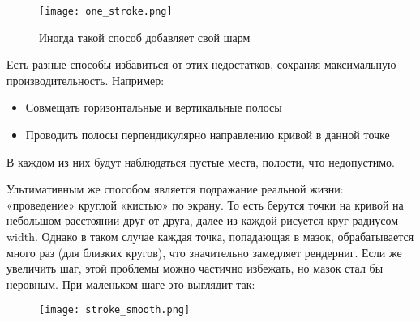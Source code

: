 \begin{figure}[h!]
    \centering
    \texttt{[image: one\_stroke.png]}
    \caption{Иногда такой способ добавляет свой шарм}
    \label{fig:pretty_vert_stroke}
\end{figure}
\FloatBarrier


Есть разные способы избавиться от этих недостатков, сохраняя максимальную производительность.
Например:
\begin{itemize}
    \item Совмещать горизонтальные и вертикальные полосы
    \item Проводить полосы перпендикулярно направлению кривой в данной точке
\end{itemize}
В каждом из них будут наблюдаться пустые места, полости, что недопустимо.

Ультимативным же способом является подражание реальной жизни: «проведение» круглой «кистью» по экрану.
То есть берутся точки на кривой на небольшом расстоянии друг от друга, далее из каждой рисуется круг радиусом width.
Однако в таком случае каждая точка, попадающая в мазок, обрабатывается много раз (для близких кругов), что значительно замедляет рендерниг.
Если же увеличить шаг, этой проблемы можно частично избежать, но мазок стал бы неровным.
При маленьком шаге это выглядит так:
\begin{figure}[h!]
    \centering
    \texttt{[image: stroke\_smooth.png]}
    \label{fig:smooth_stroke}
\end{figure}
\FloatBarrier

